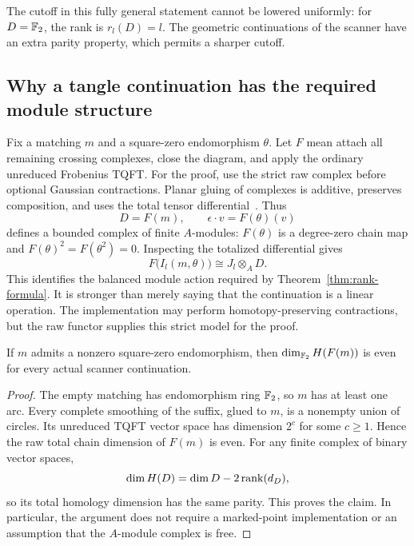 The cutoff in this fully general statement cannot be lowered uniformly:
for $D=\mathbb F_2$, the rank is $r_l(D)=l$. The geometric continuations of the
scanner have an extra parity property, which permits a sharper cutoff.

\subsection{Why a tangle continuation has the required module structure}

Fix a matching $m$ and a square-zero endomorphism $\theta$. Let $F$ mean
attach all remaining crossing complexes, close the diagram, and apply
the ordinary unreduced Frobenius TQFT. For the proof, use the strict raw
complex before optional Gaussian contractions. Planar gluing of complexes
is additive, preserves composition, and uses the total tensor
differential~\cite{barnatan}. Thus
\[
 D=F(m),\qquad \epsilon\cdot v=F(\theta)(v)
\]
defines a bounded complex of finite $A$-modules: $F(\theta)$ is a
degree-zero chain map and $F(\theta)^2=F(\theta^2)=0$. Inspecting the
totalized differential gives
\begin{equation}\label{eq:functor-tensor}
 F\bigl(I_l(m,\theta)\bigr)\cong J_l\otimes_A D.
\end{equation}
This identifies the balanced module action required by
Theorem~\ref{thm:rank-formula}. It is stronger than merely saying that
the continuation is a linear operation. The implementation may perform
homotopy-preserving contractions, but the raw functor supplies this
strict model for the proof.

\begin{lemma}\label{lem:even-suffix}
If $m$ admits a nonzero square-zero endomorphism, then
$\dim_{\mathbb F_2}H(F(m))$ is even for every actual scanner continuation.
\end{lemma}

\begin{proof}
The empty matching has endomorphism ring $\mathbb F_2$, so $m$ has at least one
arc. Every complete smoothing of the suffix, glued to $m$, is a nonempty
union of circles. Its unreduced TQFT vector space has dimension $2^c$
for some $c\ge1$. Hence the raw total chain dimension of $F(m)$ is even.
For any finite complex of binary vector spaces,
\[
 \dim H(D)=\dim D-2\operatorname{rank}(d_D),
\]
so its total homology dimension has the same parity. This proves the
claim. In particular, the argument does not require a marked-point
implementation or an assumption that the $A$-module complex is free.
\end{proof}

